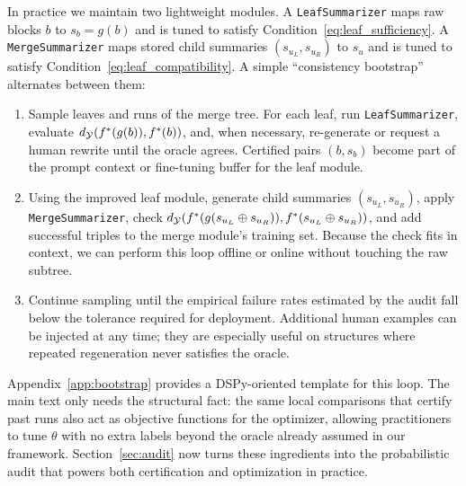 In practice we maintain two lightweight modules. A \texttt{LeafSummarizer} maps raw blocks $b$ to $s_b = g(b)$ and is tuned to satisfy Condition~\eqref{eq:leaf_sufficiency}. A \texttt{MergeSummarizer} maps stored child summaries $(s_{u_L}, s_{u_R})$ to $s_u$ and is tuned to satisfy Condition~\eqref{eq:leaf_compatibility}. A simple ``consistency bootstrap'' alternates between them:
\begin{enumerate}[label=\roman*.]
    \item Sample leaves and runs of the merge tree. For each leaf, run \texttt{LeafSummarizer}, evaluate $d_{\mathcal{Y}}(f^{\ast}(g(b)), f^{\ast}(b))$, and, when necessary, re-generate or request a human rewrite until the oracle agrees. Certified pairs $(b, s_b)$ become part of the prompt context or fine-tuning buffer for the leaf module.
    \item Using the improved leaf module, generate child summaries $(s_{u_L}, s_{u_R})$, apply \texttt{MergeSummarizer}, check $d_{\mathcal{Y}}(f^{\ast}(g(s_{u_L} \oplus s_{u_R})), f^{\ast}(s_{u_L} \oplus s_{u_R}))$, and add successful triples to the merge module's training set. Because the check fits in context, we can perform this loop offline or online without touching the raw subtree.
    \item Continue sampling until the empirical failure rates estimated by the audit fall below the tolerance required for deployment. Additional human examples can be injected at any time; they are especially useful on structures where repeated regeneration never satisfies the oracle.
\end{enumerate}
Appendix~\ref{app:bootstrap} provides a DSPy-oriented template for this loop. The main text only needs the structural fact: the same local comparisons that certify past runs also act as objective functions for the optimizer, allowing practitioners to tune $\theta$ with no extra labels beyond the oracle already assumed in our framework. Section~\ref{sec:audit} now turns these ingredients into the probabilistic audit that powers both certification and optimization in practice.
